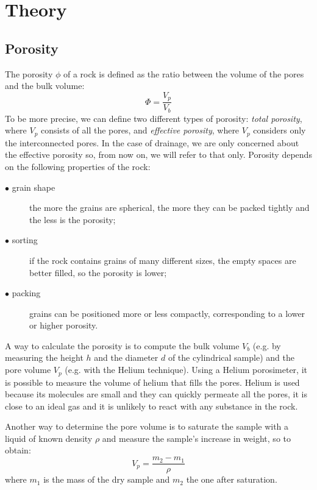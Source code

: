 \documentclass[10pt, a4paper]{amsart}
\begin{document}
\section{Theory}\label{sec:theory}

\subsection{Porosity}
The porosity $\phi$ of a rock is defined as the ratio between the volume of the pores and the bulk volume:
\begin{equation}\label{eq:Poro}
    \Phi = \frac{V_p}{V_b}
\end{equation}
To be more precise, we can define two different types of porosity: \textit{total porosity}, where $V_p$ consists of all the pores, and \textit{effective porosity}, where $V_p$ considers only the interconnected pores. In the case of drainage, we are only concerned about the effective porosity so, from now on, we will refer to that only. Porosity depends on the following properties of the rock:
\begin{description}
    \item [$\bullet$ grain shape] the more the grains are spherical, the more they can be packed tightly and the less is the porosity;
    \item [$\bullet$ sorting] if the rock contains grains of many different sizes, the empty spaces are better filled, so the porosity is lower;
    \item [$\bullet$ packing] grains can be positioned more or less compactly, corresponding to a lower or higher porosity.
\end{description}
A way to calculate the porosity is to compute the bulk volume $V_b$ (e.g. by measuring the height $h$ and the diameter $d$ of the cylindrical sample) and the pore volume $V_p$ (e.g. with the Helium technique). Using a Helium porosimeter, it is possible to measure the volume of helium that fills the pores. Helium is used because its molecules are small and they can quickly permeate all the pores, it is close to an ideal gas and it is unlikely to react with any substance in the rock. 

Another way to determine the pore volume is to saturate the sample with a liquid of known density $\rho$ and measure the sample's increase in weight, so to obtain:
\begin{equation}
    V_p = \frac{m_2 - m_1}{\rho}
\end{equation}
where $m_1$ is the mass of the dry sample and $m_2$ the one after saturation.
\end{document}
